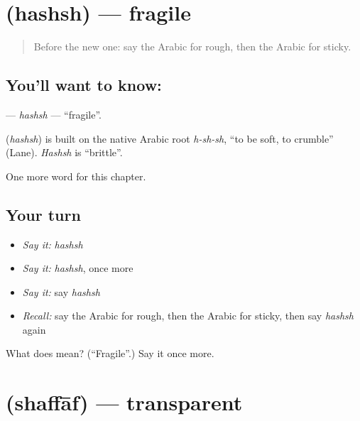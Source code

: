 \section[\texorpdfstring{\ar{هش} (hashsh)}{هش (hashsh)}]{ (hashsh) — fragile}

\label{lesson:AR-C212-hashsh}



\begin{quote}
Before the new one: say the Arabic for rough, then the Arabic for sticky.
\end{quote}

\subsection*{You'll want to know: }
\textbf{} — \emph{hashsh} — \textquotedblleft{}fragile\textquotedblright{}.

\begin{cousinweb}
\textbf{} (\emph{hashsh}) is built on the native Arabic root \emph{h-sh-sh}, \textquotedblleft{}to be soft, to crumble\textquotedblright{} (Lane). \emph{Hashsh} is \textquotedblleft{}brittle\textquotedblright{}.
\end{cousinweb}

\begin{grammarlens}[title={What you've built}]
One more word for this chapter.
\end{grammarlens}

\subsection*{Your turn}
\begin{itemize}
\raggedright
  \item \emph{Say it:} \emph{hashsh}
  \item \emph{Say it:} \emph{hashsh}, once more
  \item \emph{Say it:} say \emph{hashsh}
  \item \emph{Recall:} say the Arabic for rough, then the Arabic for sticky, then say \emph{hashsh} again
\end{itemize}

\begin{tcolorbox}[breakable,colback=teal!4,colframe=teal!35!black,title={Before you move on}]
What does  mean? (\textquotedblleft{}Fragile\textquotedblright{}.) Say it once more.
\end{tcolorbox}
\section[\texorpdfstring{\ar{شفاف} (shaffāf)}{شفاف (shaffāf)}]{ (shaffāf) — transparent}

